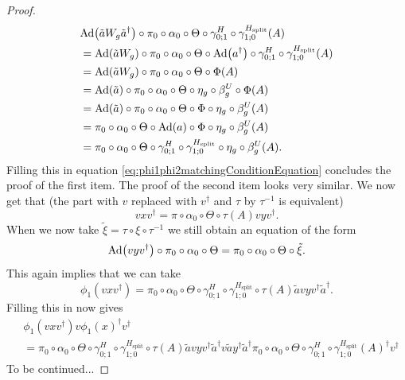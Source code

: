 \documentclass[12pt,a4paper,twoside]{article}
\let\originalleft\left
\let\originalright\right
\renewcommand{\left}{\mathopen{}\mathclose\bgroup\originalleft}
\renewcommand{\right}{\aftergroup\egroup\originalright}
\newcommand{\Ad}[1]{\textrm{Ad}\left(#1\right)}
\theoremstyle{definition}
\numberwithin{equation}{section}
\begin{document}
\begin{proof}
\begin{align}
		&\Ad{\tilde{a}W_g\tilde{a}^\dagger}\circ\pi_0\circ\alpha_0\circ\Theta\circ \gamma^{H}_{0;1}\circ\gamma^{H_\text{split}}_{1;0}(A)\\
		&=\Ad{\tilde{a}W_g}\circ\pi_0\circ\alpha_0\circ\Theta\circ\Ad{a^\dagger}\circ \gamma^{H}_{0;1}\circ\gamma^{H_\text{split}}_{1;0}(A)\\
		&=\Ad{\tilde{a}W_g}\circ\pi_0\circ\alpha_0\circ\Theta\circ\Phi(A)\\
		&=\Ad{\tilde{a}}\circ\pi_0\circ\alpha_0\circ\Theta\circ\eta_g\circ\beta_g^U\circ\Phi(A)\\
		&=\Ad{\tilde{a}}\circ\pi_0\circ\alpha_0\circ\Theta\circ\Phi\circ\eta_g\circ\beta_g^U(A)\\
		&=\pi_0\circ\alpha_0\circ\Theta\circ\Ad{a}\circ\Phi\circ\eta_g\circ\beta_g^U(A)\\
		&=\pi_0\circ\alpha_0\circ\Theta\circ \gamma^{H}_{0;1}\circ\gamma^{H_\text{split}}_{1;0} \circ\eta_g\circ\beta_g^U(A).
	\end{align}
	Filling this in equation \eqref{eq:phi1phi2matchingConditionEquation} concludes the proof of the first item. The proof of the second item looks very similar. We now get that (the part with $v$ replaced with $v^\dagger$ and $\tau$ by $\tau^{-1}$ is equivalent)
	\begin{equation}
		vxv^\dagger=\pi\circ\alpha_0\circ\Theta\circ\tau(A)vyv^\dagger.
	\end{equation}
	When we now take $\tilde\xi=\tau\circ\xi\circ\tau^{-1}$ we still obtain an equation of the form
	\begin{equation}
		\Ad{vyv^\dagger}\circ \pi_0\circ\alpha_0\circ\Theta=\pi_0\circ\alpha_0\circ\Theta\circ\tilde\xi.
	\end{equation}
	This again implies that we can take
	\begin{equation}
		\phi_1(vxv^\dagger)=\pi_0\circ\alpha_0\circ\Theta\circ\gamma^{H}_{0;1}\circ\gamma^{H_{\text{split}}}_{1;0}\circ\tau(A)\tilde{a}vyv^\dagger\tilde{a}^\dagger.
	\end{equation}
	Filling this in now gives
	\begin{align}
	&\phi_1(vxv^\dagger)v\phi_1(x)^\dagger v^\dagger\\
	&=\pi_0\circ\alpha_0\circ\Theta\circ\gamma^{H}_{0;1}\circ\gamma^{H_{\text{split}}}_{1;0}\circ\tau(A)\tilde{a}vyv^\dagger\tilde{a}^\dagger v \tilde{a}y^\dagger\tilde{a}^\dagger \pi_0\circ\alpha_0\circ\Theta\circ\gamma^{H}_{0;1}\circ\gamma^{H_{\text{split}}}_{1;0}(A)^\dagger v^\dagger
	\end{align}
	{\color{red}To be continued...}
\end{proof}
\end{document}

